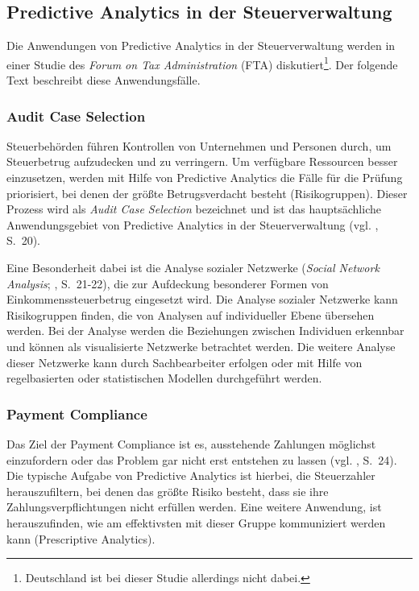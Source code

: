 \subsection{Predictive Analytics in der Steuerverwaltung}

Die Anwendungen von Predictive Analytics in der Steuerverwaltung werden in einer
Studie des \emph{Forum on Tax Administration} (FTA) diskutiert\footnote{
Deutschland ist bei dieser Studie allerdings nicht dabei.
}. Der folgende Text beschreibt diese Anwendungsfälle.

\subsubsection{Audit Case Selection}

Steuerbehörden führen Kontrollen von Unternehmen und Personen durch, um Steuerbetrug
aufzudecken und zu verringern. Um verfügbare Ressourcen besser einzusetzen, werden mit Hilfe
von Predictive Analytics die Fälle für die Prüfung priorisiert, bei denen der größte Betrugsverdacht
besteht (Risikogruppen). Dieser Prozess wird als \emph{Audit Case Selection} bezeichnet und ist das hauptsächliche
Anwendungsgebiet von Predictive Analytics in der Steuerverwaltung (vgl. \cite{OECD}, S.~20).

Eine Besonderheit dabei ist die Analyse sozialer Netzwerke (\emph{Social Network Analysis}; \cite{OECD}, S.~21-22),
die zur Aufdeckung besonderer Formen von Einkommenssteuerbetrug eingesetzt wird. Die Analyse sozialer Netzwerke kann
Risikogruppen finden, die von Analysen auf individueller Ebene übersehen werden. Bei der Analyse werden die Beziehungen
zwischen Individuen erkennbar und können als visualisierte Netzwerke betrachtet werden. Die weitere Analyse dieser Netzwerke
kann durch Sachbearbeiter erfolgen oder mit Hilfe von regelbasierten oder statistischen Modellen durchgeführt werden.

\subsubsection{Payment Compliance}

Das Ziel der Payment Compliance ist es, ausstehende Zahlungen möglichst einzufordern oder das Problem gar nicht erst
entstehen zu lassen (vgl. \cite{OECD}, S.~24). Die typische Aufgabe von Predictive Analytics ist hierbei, die
Steuerzahler herauszufiltern, bei denen das größte Risiko besteht, dass sie ihre Zahlungsverpflichtungen nicht erfüllen werden. 
Eine weitere Anwendung, ist herauszufinden, wie am effektivsten mit dieser Gruppe kommuniziert werden kann (Prescriptive Analytics).

